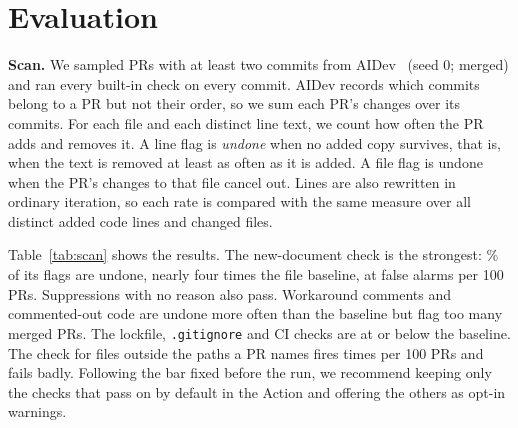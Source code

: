 \documentclass[sigconf]{acmart}
\begin{document}
\section{Evaluation}
\begin{table}[t]\centering\caption{\texttt{trellis scan} on \nPRs{} AIDev agent PRs with two or more commits. Undone: across the PR's commits, the flagged line text is removed at least as often as it is added, or the flagged file's changes cancel out (baseline: \baseLine\% of distinct added code lines, \baseFile\% of changed files). FA/100: merged PRs where none of the check's flags were undone, per 100 PRs. The bar was fixed before the run: at least 5\% undone and at most 3 FA/100.}\label{tab:scan}
\footnotesize\setlength{\tabcolsep}{3pt}\resizebox{\columnwidth}{!}{}\end{table}

\textbf{Scan.} We sampled \nPRs{} PRs with at least two commits from AIDev~\cite{li2026aidev} (seed 0; \nMerged{} merged) and ran every built-in check on every commit. AIDev records which commits belong to a PR but not their order, so we sum each PR's changes over its commits. For each file and each distinct line text, we count how often the PR adds and removes it. A line flag is \emph{undone} when no added copy survives, that is, when the text is removed at least as often as it is added. A file flag is undone when the PR's changes to that file cancel out. Lines are also rewritten in ordinary iteration, so each rate is compared with the same measure over all \nLines{} distinct added code lines and \nFiles{} changed files.

Table~\ref{tab:scan} shows the results. The new-document check is the strongest: \undoneScopeNewDoc\% of its flags are undone, nearly four times the file baseline, at \faScopeNewDoc{} false alarms per 100 PRs. Suppressions with no reason also pass. Workaround comments and commented-out code are undone more often than the baseline but flag too many merged PRs. The lockfile, \texttt{.gitignore} and CI checks are at or below the baseline. The check for files outside the paths a PR names fires \flagsScopeUnrelated{} times per 100 PRs and fails badly. Following the bar fixed before the run, we recommend keeping only the checks that pass on by default in the Action and offering the others as opt-in warnings.

\begin{table}[t]\centering\caption{Trellis and an LLM reviewer (Claude Haiku, \texttt{claude-haiku-5-5}, thinking off) on the same \lPRs{} PRs from the Table~\ref{tab:scan} sample (\lMerged{} merged) whose patches fit in \lMaxChars{} characters, so both see the same full input. Same definitions as Table~\ref{tab:scan}; line baseline on this subset: \lBase\%.}\label{tab:llm}
\footnotesize\setlength{\tabcolsep}{3pt}\resizebox{\columnwidth}{!}{}\end{table}
\end{document}
